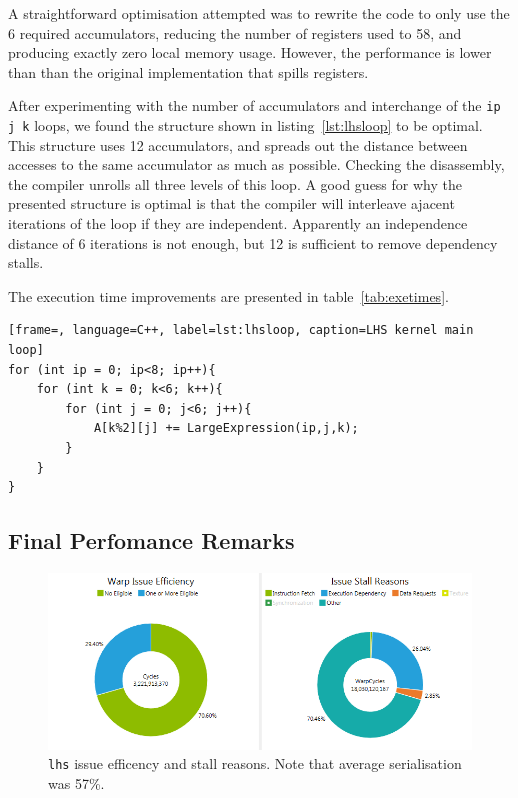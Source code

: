 \documentclass[11pt, oneside, a4paper]{article}
\begin{document}
A straightforward optimisation attempted was to rewrite the code to only use the 6 required accumulators, reducing the number of registers used to 58, and producing exactly zero local memory usage. However, the performance is lower than than the original implementation that spills registers.

After experimenting with the number of accumulators and interchange of the \verb.ip j k. loops, we found the structure shown in listing~\ref{lst:lhsloop} to be optimal. This structure uses 12 accumulators, and spreads out the distance between accesses to the same accumulator as much as possible. Checking the disassembly, the compiler unrolls all three levels of this loop. A good guess for why the presented structure is optimal is that the compiler will interleave ajacent iterations of the loop if they are independent. Apparently an independence distance of 6 iterations is not enough, but 12 is sufficient to remove dependency stalls.

The execution time improvements are presented in table~\ref{tab:exetimes}.

\begin{lstlisting}[frame=, language=C++, label=lst:lhsloop, caption=LHS kernel main loop]
for (int ip = 0; ip<8; ip++){
	for (int k = 0; k<6; k++){
		for (int j = 0; j<6; j++){
			A[k%2][j] += LargeExpression(ip,j,k);
		}
	}
}
\end{lstlisting}


\subsection{Final Perfomance Remarks} %
\label{sub:final_performance_remarks}

\begin{figure}[tb]
	\begin{center}
		\includegraphics[width=\textwidth]{"LHS efficency and stall reason"}
	\end{center}
	\caption{\texttt{lhs} issue efficency and stall reasons. Note that average serialisation was 57\%.}
	\label{fig:issue_eff_and_stall_reasons}
\end{figure}
\end{document}
